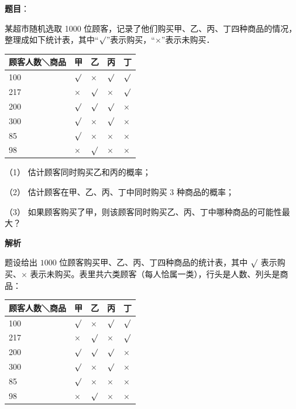 \begin{answer}

\textbf{题目}：

某超市随机选取 1000 位顾客，记录了他们购买甲、乙、丙、丁四种商品的情况，整理成如下统计表，其中“\(\surd\)”表示购买，“\(\times\)”表示未购买．

\begin{center}
\begin{tabular}{lllll}
\toprule
顾客人数＼商品 & 甲 & 乙 & 丙 & 丁 \\
\midrule
100 & \(\surd\) & \(\times\) & \(\surd\) & \(\surd\) \\
217 & \(\times\) & \(\surd\) & \(\times\) & \(\surd\) \\
200 & \(\surd\) & \(\surd\) & \(\surd\) & \(\times\) \\
300 & \(\surd\) & \(\times\) & \(\surd\) & \(\times\) \\
85 & \(\surd\) & \(\times\) & \(\times\) & \(\times\) \\
98 & \(\times\) & \(\surd\) & \(\times\) & \(\times\) \\
\bottomrule
\end{tabular}
\end{center}

（1） 估计顾客同时购买乙和丙的概率；

（2） 估计顾客在甲、乙、丙、丁中同时购买 3 种商品的概率；

（3） 如果顾客购买了甲，则该顾客同时购买乙、丙、丁中哪种商品的可能性最大？

\textbf{解析}

题设给出 \(1000\) 位顾客购买甲、乙、丙、丁四种商品的统计表，其中 \(\surd\) 表示购买、\(\times\) 表示未购买。表里共六类顾客（每人恰属一类），行头是人数、列头是商品：

\begin{center}
\begin{tabular}{lllll}
\toprule
顾客人数＼商品 & 甲 & 乙 & 丙 & 丁 \\
\midrule
100 & \(\surd\) & \(\times\) & \(\surd\) & \(\surd\) \\
217 & \(\times\) & \(\surd\) & \(\times\) & \(\surd\) \\
200 & \(\surd\) & \(\surd\) & \(\surd\) & \(\times\) \\
300 & \(\surd\) & \(\times\) & \(\surd\) & \(\times\) \\
85 & \(\surd\) & \(\times\) & \(\times\) & \(\times\) \\
98 & \(\times\) & \(\surd\) & \(\times\) & \(\times\) \\
\bottomrule
\end{tabular}
\end{center}


\end{answer}
